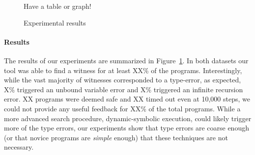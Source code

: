 \begin{figure}[t]

  Have a table or graph! 
\caption{Experimental results}
\label{fig:results-witness}
\end{figure}

\paragraph{Results}
\label{sec:results-witness}
The results of our experiments are summarized in
Figure~\ref{fig:results-witness}.
%
In both datasets our tool was able to find a witness for at least XX\%
of the programs.
%
Interestingly, while the vast majority of witnesses corresponded to a
type-error, as expected, X\% triggered an unbound variable error and X\%
triggered an infinite recursion error.
%
XX programs were deemed safe and XX timed out even at 10,000 steps, \ie
we could not provide any useful feedback for XX\% of the total programs.
%
While a more advanced search procedure, \eg dynamic-symbolic execution,
could likely trigger more of the type errors, our experiments show that
type errors are coarse enough (or that novice programs are \emph{simple}
enough) that these techniques are not necessary.



